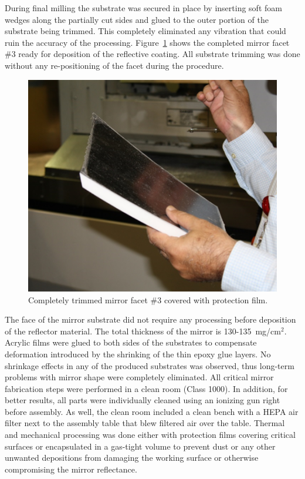 During final milling the substrate was secured in place by inserting soft foam wedges along the partially cut sides
and glued to the outer portion of the substrate being trimmed. This completely eliminated any vibration that could
ruin the accuracy of the processing. Figure~\ref{fig:Trimmed} shows the completed mirror facet \#3 ready for
deposition of the reflective coating. All substrate trimming was done without any re-positioning of the facet during
the procedure. 

\begin{figure}[ht]
    \centering
    \includegraphics[width=1.0\linewidth]{images/Trimmed}
    \caption{Completely trimmed mirror facet \#3 covered with protection film. }
    \label{fig:Trimmed}
\end{figure}

The face of the mirror substrate did not require any processing before deposition of the reflector material. The
total thickness of the mirror is 130-135~mg/cm$^2$. Acrylic films were glued to both sides of the substrates to
compensate deformation introduced by the shrinking of the thin epoxy glue layers. No shrinkage effects in any of
the produced substrates was observed, thus long-term problems with mirror shape were completely eliminated.
All critical mirror fabrication steps were performed in a clean room (Class 1000). In addition, for better results,
all parts were individually cleaned using an ionizing gun right before assembly. As well, the clean room included a
clean bench with a HEPA air filter next to the assembly table that blew filtered air over the table. Thermal and
mechanical processing was done either with protection films covering critical surfaces or encapsulated in a
gas-tight volume to prevent dust or any other unwanted depositions from damaging the working surface or
otherwise compromising the mirror reflectance.

